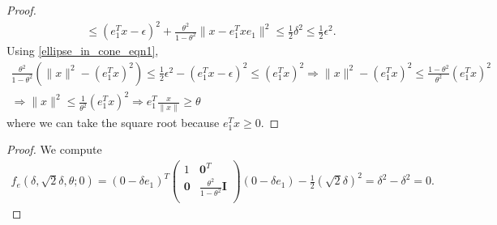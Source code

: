 \begin{proof}
\begin{align*}
\le (e_1^Tx - \epsilon)^2 + \frac{\theta^2}{1 - \theta^2}\|x - e_1^Tx e_1\|^2 \le \frac 1 2 \delta^2 \le \frac 1 2 \epsilon^2.
\end{align*}
Using \cref{ellipse_in_cone_eqn1}, 
\begin{align*}
\frac{\theta^2}{1 - \theta^2}(\|x\|^2 - (e_1^Tx)^2) \le \frac 1 2 \epsilon^2 - (e_1^Tx - \epsilon)^2 \le (e_1^Tx)^2
\Longrightarrow \|x\|^2 - (e_1^Tx)^2 \le \frac{1 - \theta^2}{\theta^2}(e_1^Tx)^2 \\
\Longrightarrow \|x\|^2 \le \frac 1 {\theta^2}(e_1^Tx)^2
\Longrightarrow e_1^T\frac{x}{\|x\|} \ge \theta
\end{align*}
where we can take the square root because $e_1^Tx \ge 0$.
\end{proof}

\begin{proof}
We compute
\begin{align*}
f_e(\delta, \sqrt{2}\delta, \theta; 0) =(0 - \delta e_1)^T\begin{pmatrix}
1 & \boldsymbol0^T \\
\boldsymbol 0 & \frac{\theta^2}{1 - \theta^2} \boldsymbol I \\
\end{pmatrix}(0 - \delta e_1) - \frac 1 2 (\sqrt 2 \delta)^2
=\delta^2 - \delta^2 = 0.
\end{align*}
\end{proof}


